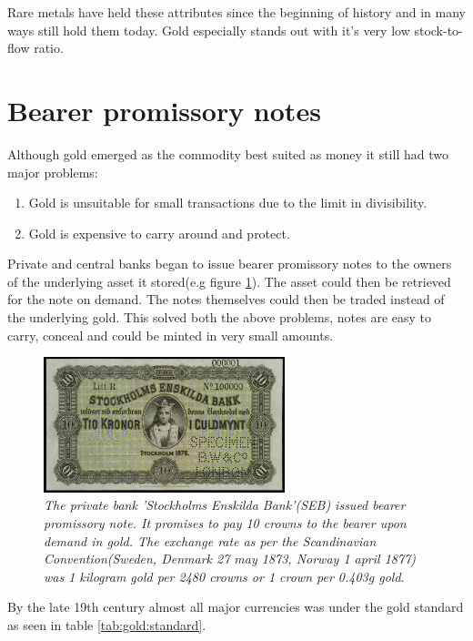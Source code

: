 Rare metals have held these attributes since the beginning of history and in many ways still hold them today. Gold especially stands out with it's very low stock-to-flow ratio.

\section{Bearer promissory notes}

Although gold emerged as the commodity best suited as money
it still had two major problems:

\begin{enumerate}
	\item Gold is unsuitable for small transactions due to the limit in divisibility.
	\item Gold is expensive to carry around and protect.
\end{enumerate}

Private and central banks began to issue bearer promissory notes to the owners of the underlying asset it stored(e.g figure \ref{fig:seb:promissory:note}). 
The asset could then be retrieved for the note on demand. The notes themselves could then be traded 
instead of the underlying gold. This solved both the above problems, notes are easy to carry, conceal and 
could be minted in very small amounts. 

\begin{figure}[!htb]

	\centering
	\includegraphics[width=7cm]{external/PrivateBankNoteStockholmEnskildaBank1876.JPG}
	\caption{\textit{The private bank 'Stockholms Enskilda Bank'(SEB) issued bearer
	promissory note. It promises to pay 10 crowns to the bearer upon demand in gold. 
	The exchange rate as per the Scandinavian Convention(Sweden, Denmark 27 may 1873, Norway 1 april 1877)\cite{nordic:crown}
	was 1 kilogram gold per 2480 crowns or 1 crown per 0.403g gold\cite{crown:gold}. 
 }}
	\label{fig:seb:promissory:note}
\end{figure}

By the late 19th century almost all major currencies was under the gold standard as seen in table \ref{tab:gold:standard}.

